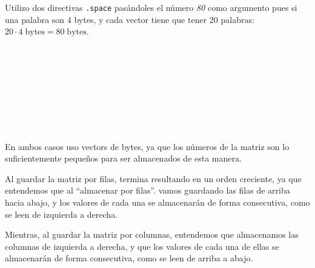 \documentclass[a4paper]{report}
\begin{document}
\inputminted[linenos]{mips}{src/problemas/2.asm}

Utilizo dos directivas \texttt{.space} pasándoles el número \textit{80} como argumento pues si una palabra son 4 bytes, y cada vector tiene que tener 20 palabras: $20 \cdot 4\;\text{bytes} = 80\;\text{bytes}$.

\section{}

\inputminted[linenos]{mips}{src/problemas/3.asm}


\section{}

\inputminted[linenos]{mips}{src/problemas/4.asm}


\section{}

\inputminted[linenos, breaklines, breakbytokenanywhere]{mips}{src/problemas/5.asm}


\section{}

\inputminted[linenos]{mips}{src/problemas/6.asm}

En ambos casos uso vectors de bytes, ya que los números de la matriz son lo suficientemente pequeños para ser almacenados de esta manera.

Al guardar la matriz por filas, termina resultando en un orden creciente, ya que entendemos que al ``almacenar por filas''. vamos guardando las filas de arriba hacia abajo, y los valores de cada una se almacenarán de forma consecutiva, como se leen de izquierda a derecha.

Mientras, al guardar la matriz por columnas, entendemos que almacenamos las columnas de izquierda a derecha, y que los valores de cada una de ellas se almacenarán de forma consecutiva, como se leen de arriba a abajo.
\end{document}
